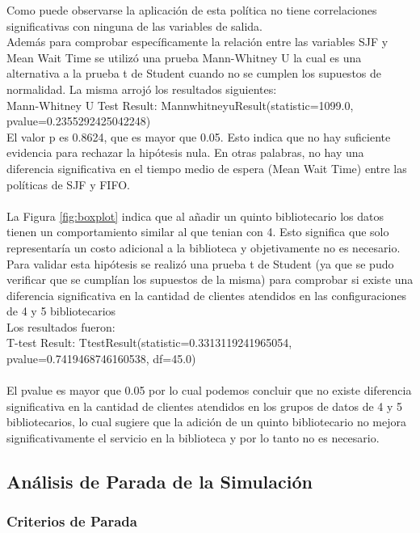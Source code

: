 \documentclass[10pt,twocolumn]{article}
\begin{document}
 Como puede observarse la aplicación de esta política no tiene correlaciones significativas con ninguna de las variables de salida. \\
Además para comprobar específicamente la relación entre las variables SJF y Mean Wait Time se utilizó una prueba  Mann-Whitney U la cual es una alternativa a la prueba t de Student cuando no se cumplen los supuestos de normalidad. La misma arrojó los resultados siguientes:\\
Mann-Whitney U Test Result: MannwhitneyuResult(statistic=1099.0, pvalue=0.2355292425042248) \\
El valor p es 0.8624, que es mayor que 0.05. Esto indica que no hay suficiente evidencia para rechazar la hipótesis nula. En otras palabras, no hay una diferencia significativa en el tiempo medio de espera (Mean Wait Time) entre las políticas de SJF y FIFO.\\
\\
La Figura \ref{fig:boxplot} indica que al añadir un quinto bibliotecario los datos tienen un comportamiento similar al que tenian con 4. Esto significa que solo representaría un costo adicional a la biblioteca y objetivamente no es necesario. Para validar esta hipótesis se realizó una prueba t de Student (ya que se pudo verificar que se cumplían los supuestos de la misma) para comprobar si existe una diferencia significativa en la cantidad de clientes atendidos en las configuraciones de 4 y 5 bibliotecarios\\
Los resultados fueron:\\
T-test Result: TtestResult(statistic=0.3313119241965054, pvalue=0.7419468746160538, df=45.0)\\
\\
El pvalue es mayor que 0.05 por lo cual podemos concluir que no existe diferencia significativa en la cantidad de clientes atendidos en los grupos de datos de 4 y 5 bibliotecarios, lo cual sugiere que la adición de un quinto bibliotecario no mejora significativamente el servicio en la biblioteca y por lo tanto no es necesario.



\subsection{Análisis de Parada de la Simulación}

\subsubsection{Criterios de Parada}
\end{document}
